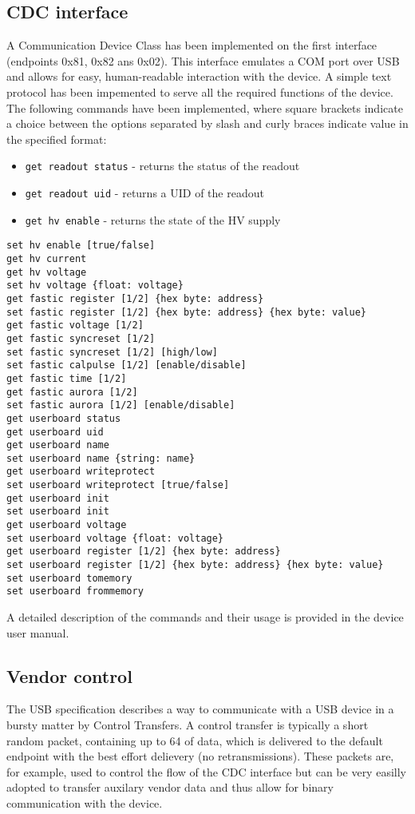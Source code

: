 \subsection{CDC interface}
A Communication Device Class has been implemented on the first interface (endpoints 0x81, 0x82 ans 0x02). This interface emulates a COM port over USB and allows for easy, human-readable interaction with the device. A simple text protocol has been impemented to serve all the required functions of the device. 
\newpage
The following commands have been implemented, where square brackets indicate a choice between the options separated by slash and curly braces indicate value in the specified format:
%
\begin{itemize}
    \item \verb|get readout status| - returns the status of the readout
    \item \verb|get readout uid| - returns a UID of the readout
    \item \verb|get hv enable| - returns the state of the HV supply
\end{itemize}
\begin{verbatim}
set hv enable [true/false]
get hv current
get hv voltage
set hv voltage {float: voltage}
get fastic register [1/2] {hex byte: address}
set fastic register [1/2] {hex byte: address} {hex byte: value}
get fastic voltage [1/2]
get fastic syncreset [1/2]
set fastic syncreset [1/2] [high/low]
set fastic calpulse [1/2] [enable/disable]
get fastic time [1/2]
get fastic aurora [1/2]
set fastic aurora [1/2] [enable/disable]
get userboard status
get userboard uid
get userboard name
set userboard name {string: name}
get userboard writeprotect
set userboard writeprotect [true/false]
get userboard init
set userboard init 
get userboard voltage 
set userboard voltage {float: voltage}
get userboard register [1/2] {hex byte: address}
set userboard register [1/2] {hex byte: address} {hex byte: value}
set userboard tomemory
set userboard frommemory
\end{verbatim}

A detailed description of the commands and their usage is provided in the device user manual.

\subsection{Vendor control}
The USB specification describes a way to communicate with a USB device in a bursty matter by Control Transfers. A control transfer is typically a short random packet, containing up to \SI{64}{\byte} of data, which is delivered to the default endpoint with the best effort delievery (no retransmissions). These packets are, for example, used to control the flow of the CDC interface but can be very easilly adopted to transfer auxilary vendor data and thus allow for binary communication with the device. 

